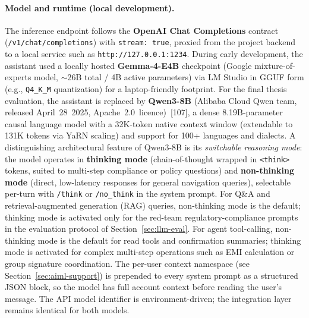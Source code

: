 \documentclass[12pt,a4paper]{report}
\begin{document}
\paragraph{Model and runtime (local development).}
The inference endpoint follows the \textbf{OpenAI Chat Completions} contract (\texttt{/v1/chat/completions}) with \texttt{stream: true}, proxied from the project backend to a local service such as \texttt{http://127.0.0.1:1234}. During early development, the assistant used a locally hosted \textbf{Gemma-4-E4B} checkpoint (Google mixture-of-experts model, $\sim$26B total / 4B active parameters) via LM Studio in GGUF form (e.g., \texttt{Q4\_K\_M} quantization) for a laptop-friendly footprint. For the final thesis evaluation, the assistant is replaced by \textbf{Qwen3-8B} (Alibaba Cloud Qwen team, released April~28~2025, Apache~2.0~licence)~[107], a dense 8.19B-parameter causal language model with a 32K-token native context window (extendable to 131K tokens via YaRN scaling) and support for 100+ languages and dialects. A distinguishing architectural feature of Qwen3-8B is its \emph{switchable reasoning mode}: the model operates in \textbf{thinking mode} (chain-of-thought wrapped in \texttt{<think>} tokens, suited to multi-step compliance or policy questions) and \textbf{non-thinking mode} (direct, low-latency responses for general navigation queries), selectable per-turn with \texttt{/think} or \texttt{/no\_think} in the system prompt. For Q\&A and retrieval-augmented generation (RAG) queries, non-thinking mode is the default; thinking mode is activated only for the red-team regulatory-compliance prompts in the evaluation protocol of Section~\ref{sec:llm-eval}. For agent tool-calling, non-thinking mode is the default for read tools and confirmation summaries; thinking mode is activated for complex multi-step operations such as EMI calculation or group signature coordination. The per-user context namespace (see Section~\ref{sec:aiml-support}) is prepended to every system prompt as a structured JSON block, so the model has full account context before reading the user's message. The API model identifier is environment-driven; the integration layer remains identical for both models.
\end{document}
